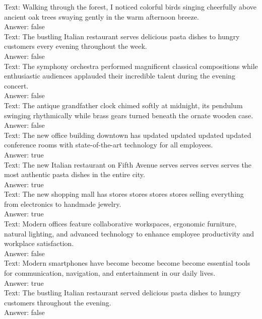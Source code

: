 \begin{smalluserbox}
Text: Walking through the forest, I noticed colorful birds singing cheerfully above ancient oak trees swaying gently in the warm afternoon breeze.\\
Answer: false\\

Text: The bustling Italian restaurant serves delicious pasta dishes to hungry customers every evening throughout the week.\\
Answer: false\\

Text: The symphony orchestra performed magnificent classical compositions while enthusiastic audiences applauded their incredible talent during the evening concert.\\
Answer: false\\

Text: The antique grandfather clock chimed softly at midnight, its pendulum swinging rhythmically while brass gears turned beneath the ornate wooden case.\\
Answer: false\\

Text: The new office building downtown has updated updated updated updated conference rooms with state-of-the-art technology for all employees.\\
Answer: true\\

Text: The new Italian restaurant on Fifth Avenue serves serves serves serves the most authentic pasta dishes in the entire city.\\
Answer: true\\

Text: The new shopping mall has stores stores stores stores selling everything from electronics to handmade jewelry.\\
Answer: true\\

Text: Modern offices feature collaborative workspaces, ergonomic furniture, natural lighting, and advanced technology to enhance employee productivity and workplace satisfaction.\\
Answer: false\\

Text: Modern smartphones have become become become become essential tools for communication, navigation, and entertainment in our daily lives.\\
Answer: true\\

Text: The bustling Italian restaurant served delicious pasta dishes to hungry customers throughout the evening.\\
Answer: false\\


\end{smalluserbox}
